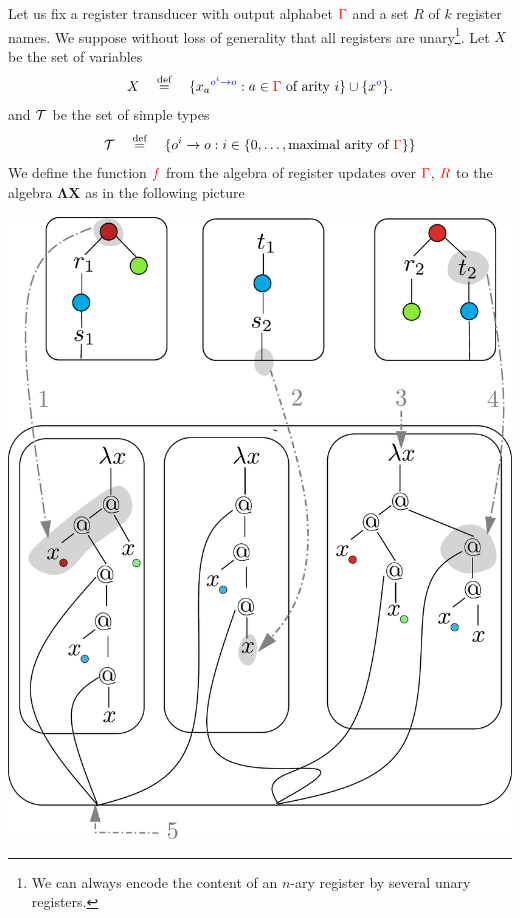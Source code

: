 Let us fix a register transducer with output alphabet ${\color{red}{\Gamma}}$ and a set $R$ of $k$ register names. 
We suppose without loss of generality that all registers are unary\footnote{We can always encode the content of an $n$-ary register by several unary registers.}. Let $X$ be the set of variables 
\begin{align*}
X  \quad \stackrel{\text{def}}= \quad \{{x_a}^{\color{blue}{o^i \to o}} : a \in {\color{red}{\Gamma}} \text{ of arity $i$}\} \cup \{{x}^{\color{blue}{o}}\}.
\end{align*}
and ${\mathcal T}$ be the set of simple types 
\begin{align*}
    {\mathcal T} \quad \stackrel{\text{def}}= \quad \{o^i \to o : i \in \{0,\ldots,\text{maximal arity of ${\color{red}{\Gamma}}$}\}\}
\end{align*}
We define the function ${\color{red}{f}}$ from the algebra of register updates over ${\color{red}{\Gamma}}$, ${\color{red}{R}}$ to  the algebra $\mathbf{\Lambda X}$ as in the following picture
\begin{center}
\includegraphics[scale=.4]{embedding.pdf}
\end{center}

